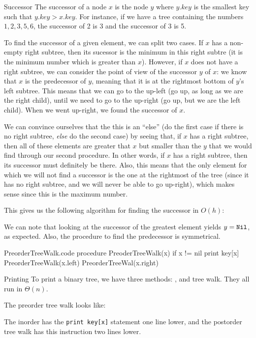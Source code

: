 \documentclass[a4paper]{article}
\begin{document}
\begin{parag}{Successor}
    The successor of a node $x$ is the node $y$ where $y.key$ is the smallest key such that $y.key > x.key$. For instance, if we have a tree containing the numbers $1, 2, 3, 5, 6$, the successor of 2 is 3 and the successor of 3 is 5.

    To find the successor of a given element, we can split two cases. If $x$ has a non-empty right subtree, then its sucessor is the minimum in this right subtre (it is the minimum number which is greater than $x$). However, if $x$ does not have a right subtree, we can consider the point of view of the successor $y$ of $x$: we know that $x$ is the predecessor of $y$, meaning that it is at the rightmost bottom of $y$'s left subtree. This means that we can go to the up-left (go up, as long as we are the right child), until we need to go to the up-right (go up, but we are the left child). When we went up-right, we found the successor of $x$.

    We can convince ourselves that the this is an ``else'' (do the first case if there is no right subtree, \textit{else} do the second case) by seeing that, if $x$ has a right subtree, then all of these elements are greater that $x$ but smaller than the $y$ that we would find through our second procedure. In other words, if $x$ has a right subtree, then its successor must definitely be there. Also, this means that the only element for which we will not find a successor is the one at the rightmost of the tree (since it has no right subtree, and we will never be able to go up-right), which makes sense since this is the maximum number.

    This gives us the following algorithm for finding the successor in $O\left(h\right)$:

    We can note that looking at the successor of the greatest element yields $y = \text{\texttt{Nil}}$, as expected. Also, the procedure to find the predecessor is symmetrical.
\end{parag}

\begin{filecontents*}[overwrite]{PreorderTreeWalk.code}
procedure PreoderTreeWalk(x)
    if x != nil
        print key[x]
        PreorderTreeWalk(x.left)
        PreorderTreeWal(x.right)
\end{filecontents*}

\begin{parag}{Printing}
    To print a binary tree, we have three methods: ,  and  tree walk. They all run in $\Theta\left(n\right)$.

    The preorder tree walk looks like:
    
    The inorder has the \texttt{print key[x]} statement one line lower, and the postorder tree walk has this instruction two lines lower.
\end{parag}
\end{document}
